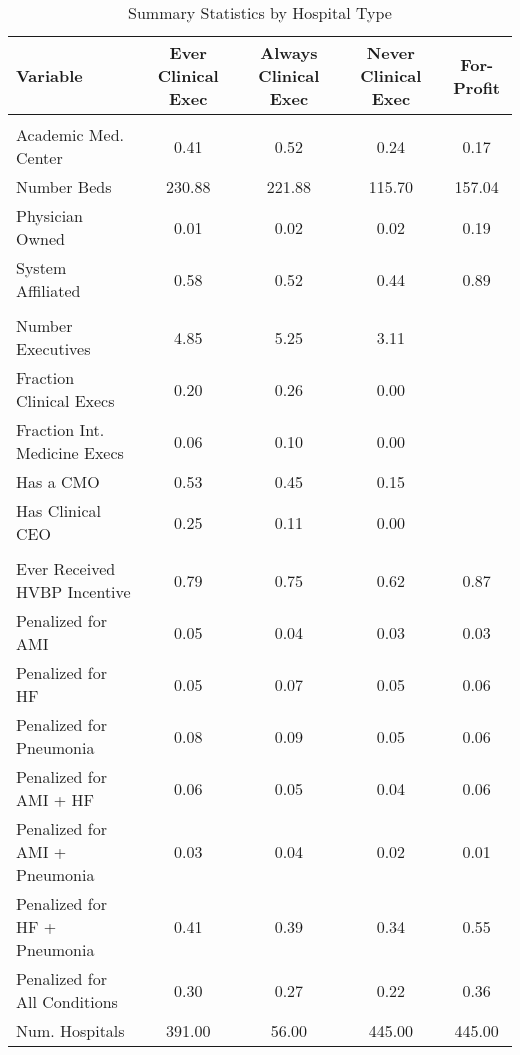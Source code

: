 \begin{table}[ht!]
\centering
\caption{\label{tab:fp_samples_stable}Summary Statistics by Hospital Type}
\centering
\begin{tabular}[t]{lcccc}
\toprule
Variable & Ever Clinical Exec & Always Clinical Exec & Never Clinical Exec & For-Profit\\
\midrule
\addlinespace[0.3em]
\multicolumn{5}{l}{\textbf{Hospital Characteristics}}\\
\hspace{1em}Academic Med. Center & 0.41 & 0.52 & 0.24 & 0.17\\
\hspace{1em}Number Beds & 230.88 & 221.88 & 115.70 & 157.04\\
\hspace{1em}Physician Owned & 0.01 & 0.02 & 0.02 & 0.19\\
\hspace{1em}System Affiliated & 0.58 & 0.52 & 0.44 & 0.89\\
\addlinespace[0.3em]
\multicolumn{5}{l}{\textbf{Executive Team Characteristics}}\\
\hspace{1em}Number Executives & 4.85 & 5.25 & 3.11 & \\
\hspace{1em}Fraction Clinical Execs & 0.20 & 0.26 & 0.00 & \\
\hspace{1em}Fraction Int. Medicine Execs & 0.06 & 0.10 & 0.00 & \\
\hspace{1em}Has a CMO & 0.53 & 0.45 & 0.15 & \\
\hspace{1em}Has Clinical CEO & 0.25 & 0.11 & 0.00 & \\
\addlinespace[0.3em]
\multicolumn{5}{l}{\textbf{Penalty/Payment Variables}}\\
\hspace{1em}Ever Received HVBP Incentive & 0.79 & 0.75 & 0.62 & 0.87\\
\hspace{1em}Penalized for AMI & 0.05 & 0.04 & 0.03 & 0.03\\
\hspace{1em}Penalized for HF & 0.05 & 0.07 & 0.05 & 0.06\\
\hspace{1em}Penalized for Pneumonia & 0.08 & 0.09 & 0.05 & 0.06\\
\hspace{1em}Penalized for AMI + HF & 0.06 & 0.05 & 0.04 & 0.06\\
\hspace{1em}Penalized for AMI + Pneumonia & 0.03 & 0.04 & 0.02 & 0.01\\
\hspace{1em}Penalized for HF + Pneumonia & 0.41 & 0.39 & 0.34 & 0.55\\
\hspace{1em}Penalized for All Conditions & 0.30 & 0.27 & 0.22 & 0.36\\
Num. Hospitals & 391.00 & 56.00 & 445.00 & 445.00\\
\bottomrule
\end{tabular}
\end{table}
